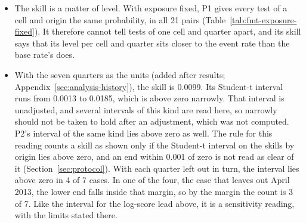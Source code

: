 \begin{itemize}
\item The skill is a matter of level. With exposure fixed, P1 gives every test of a cell and origin the same probability, in all 21 pairs (Table~\ref{tab:fmt-exposure-fixed}). It therefore cannot tell tests of one cell and quarter apart, and its skill says that its level per cell and quarter sits closer to the event rate than the base rate's does.
\item With the seven quarters as the units (added after results; Appendix~\ref{sec:analysis-history}), the skill is 0.0099. Its Student-t interval runs from 0.0013 to 0.0185, which is above zero narrowly. That interval is unadjusted, and several intervals of this kind are read here, so narrowly should not be taken to hold after an adjustment, which was not computed. P2's interval of the same kind lies above zero as well. The rule for this reading counts a skill as shown only if the Student-t interval on the skills by origin lies above zero, and an end within 0.001 of zero is not read as clear of it (Section~\ref{sec:protocol}). With each quarter left out in turn, the interval lies above zero in 4 of 7 cases. In one of the four, the case that leaves out April 2013, the lower end falls inside that margin, so by the margin the count is 3 of 7. Like the interval for the log-score lead above, it is a sensitivity reading, with the limits stated there.

\end{itemize}
